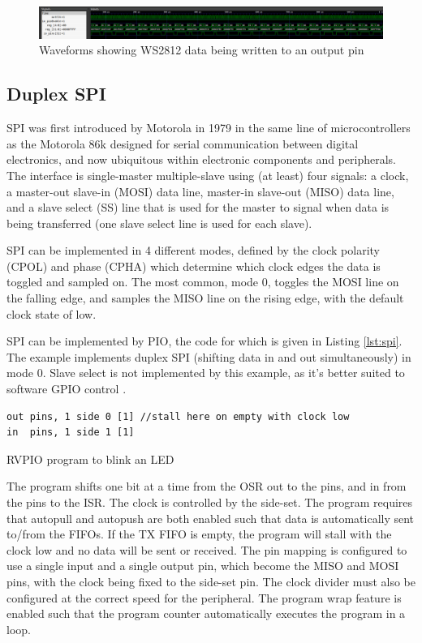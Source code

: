 \begin{figure}[H]
    \centering
    \includegraphics[width=\textwidth]{../img/ws2812-2.png}
    \caption{Waveforms showing WS2812 data being written to an output pin}
    \label{fig:ws2812-2}
\end{figure}

\subsection{Duplex SPI}
\label{sec:spi}

SPI was first introduced by Motorola in 1979 in the same line of microcontrollers as the Motorola 86k designed for serial communication between digital electronics, and now ubiquitous within electronic components and peripherals. The interface is single-master multiple-slave using (at least) four signals: a clock, a master-out slave-in (MOSI) data line, master-in slave-out (MISO) data line, and a slave select (SS) line that is used for the master to signal when data is being transferred (one slave select line is used for each slave).

SPI can be implemented in 4 different modes, defined by the clock polarity (CPOL) and phase (CPHA) which determine which clock edges the data is toggled and sampled on. The most common, mode 0, toggles the MOSI line on the falling edge, and samples the MISO line on the rising edge, with the default clock state of low.

SPI can be implemented by PIO, the code for which is given in Listing \ref{lst:spi}. The example implements duplex SPI (shifting data in and out simultaneously) in mode 0. Slave select is not implemented by this example, as it's better suited to software GPIO control \cite{rp2040}.

\begin{listing}[h!]
    \begin{verbatim}
out pins, 1 side 0 [1] //stall here on empty with clock low
in  pins, 1 side 1 [1] 
    \end{verbatim}
    \caption{RVPIO program to blink an LED \cite{rp2040}}
    \label{lst:spi}
\end{listing}

The program shifts one bit at a time from the OSR out to the pins, and in from the pins to the ISR. The clock is controlled by the side-set. The program requires that autopull and autopush are both enabled such that data is automatically sent to/from the FIFOs. If the TX FIFO is empty, the program will stall with the clock low and no data will be sent or received. The pin mapping is configured to use a single input and a single output pin, which become the MISO and MOSI pins, with the clock being fixed to the side-set pin. The clock divider must also be configured at the correct speed for the peripheral. The program wrap feature is enabled such that the program counter automatically executes the program in a loop.

